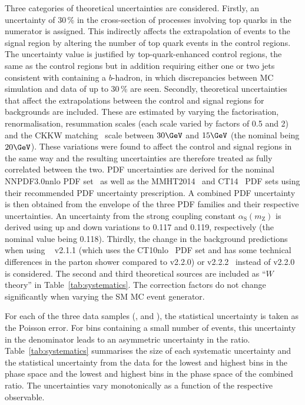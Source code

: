 \documentclass[cernpreprint,txfonts,UKenglish,texlive=2016]{\ATLASLATEXPATH atlasdoc}
\begin{document}
Three categories of theoretical uncertainties are considered.
Firstly, an uncertainty of 30\,\% in the cross-section of processes
involving top quarks in the numerator is assigned.
This indirectly affects the extrapolation of \W{} events to the signal
region by altering the number of top quark events in the control
regions. 
The uncertainty value is justified by top-quark-enhanced control
regions, the same as the \W{} control regions but in addition requiring either one
or two jets consistent with containing a $b$-hadron, in which discrepancies between MC simulation and
data of up to 30\,\% are seen. 
Secondly, theoretical uncertainties that affect the
extrapolations between the control and signal regions for \W{}
backgrounds are included. These are estimated by varying the factorisation,
renormalisation, resummation scales (each scale varied by factors of 0.5 and 2) and
the CKKW matching~\cite{Catani:2001cc,Hoeche:2009rj}  scale between $30\GeV$ and $15\GeV$ (the nominal being $20\GeV$).
These variations were found to affect the control and signal regions in the same way and the resulting uncertainties 
are therefore treated as fully correlated between the two.
PDF uncertainties are derived for the nominal NNPDF3.0nnlo PDF set~\cite{Ball:2014uwa} as well as
the MMHT2014~\cite{Harland-Lang:2014zoa} and CT14~\cite{Dulat:2015mca} PDF sets using their recommended PDF uncertainty prescription.
A combined PDF uncertainty is then obtained from the envelope of the three PDF families and their respective uncertainties.
An uncertainty from the strong coupling constant
$\alpha_{\mathrm{S}} \left(m_{\mathrm{Z}}\right)$ is
derived using up and down variations to 0.117 and 0.119, respectively
(the nominal value being 0.118). 
Thirdly, the change in the \W{} background predictions when using \sherpa{}~\cite{Gleisberg:2008ta}
v2.1.1 (which uses the CT10nlo~\cite{Lai:2010vv}  PDF set and has some technical
differences in the parton shower compared to v2.2.0) or \mgfive{} v2.2.2~\cite{Alwall:2011uj} instead of \sherpa{} v2.2.0 is considered.
The second and third theoretical sources are included as
``$W$ theory'' in Table~\ref{tab:systematics}.
The correction factors do not change significantly when varying the SM MC event generator.

For each of the three data samples (\ptmissjet{}, \eejet{} and \mmjet{}), the statistical uncertainty is taken as the 
Poisson error. 
For bins containing  a small number of events,
this uncertainty in the denominator leads to an asymmetric uncertainty
in the ratio. 
Table~\ref{tab:systematics} summarises the size of each  systematic
uncertainty and the statistical uncertainty from the data for the lowest and highest \ptmiss{} bins in the
\onejet{} phase space and the lowest and highest \mjj{} bins in the
\vbf{} phase space of the combined ratio.
The uncertainties vary monotonically as a function of the respective observable.
\end{document}
